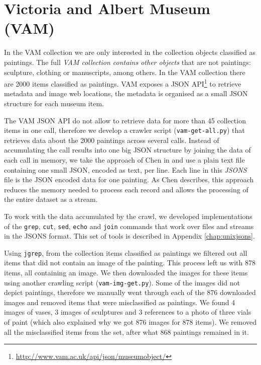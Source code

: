\documentclass[11pt,a4paper,twoside,openright]{report}
\begin{document}
\section{Victoria and Albert Museum (VAM)}

In the VAM collection we are only interested in the collection objects
classified as paintings.  The full \emph{VAM collection contains other objects}
that are not paintings: sculpture, clothing or manuscripts, among others.  In
the VAM collection there are 2000 items classified as paintings.  VAM exposes a
JSON API\footnote{\href{http://www.vam.ac.uk/api/json/museumobject/}
{http://www.vam.ac.uk/api/json/museumobject/}} to retrieve metadata and image
web locations, the metadata is organised as a small JSON structure for each
museum item.

The VAM JSON API do not allow to retrieve data for more than 45 collection
items in one call, therefore we develop a crawler script
(\texttt{vam-get-all.py}) that retrieves data about the 2000 paintings across
several calls.  Instead of accumulating the call results into one big JSON
structure by joining the data of each call in memory, we take the approach of
Chen in \cite{chen09yahoo} and use a plain text file containing one small JSON,
encoded as text, per line.  Each line in this \emph{JSONS} file is the JSON
encoded data for one painting.  As Chen \cite{chen09yahoo} describes, this
approach reduces the memory needed to process each record and allows the
processing of the entire dataset as a stream.

To work with the data accumulated by the crawl, we developed implementations of
the \texttt{grep}, \texttt{cut}, \texttt{sed}, \texttt{echo} and \texttt{join}
commands that work over files and streams in the JSONS format.  This set of
tools is described in Appendix \ref{chap:unixjsons}.

Using \texttt{jgrep}, from the collection items classified as paintings we
filtered out all items that did not contain an image of the painting.  This
process left us with 878 items, all containing an image.  We then downloaded
the images for these items using another crawling script
(\texttt{vam-img-get.py}).  Some of the images did not depict paintings,
therefore we manually went through each of the 876 downloaded images and
removed items that were misclassified as paintings.  We found 4 images of
vases, 3 images of sculptures and 3 references to a photo of three vials of
paint (which also explained why we got 876 images for 878 items).  We removed
all the misclassified items from the set, after what 868 paintings remained in
it.
\end{document}

